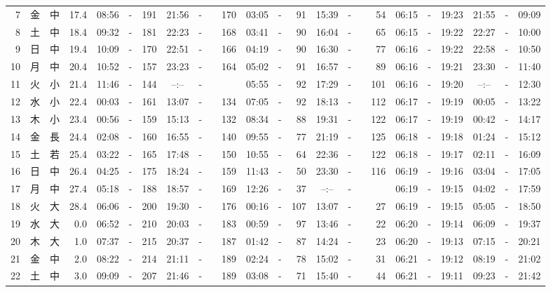 \documentclass[12pt,a4j]{jsarticle}
\begin{document}
\begin{table}[htbp]
\begin{center}
{\begin{tabular}{|rc|cr|ccrccr|ccrccr|ccc|ccc|}
 7 & 金 & 中 & 17.4 &  08:56 &-& 191 &  21:56 &-& 170 &  03:05 &-&  91 &  15:39 &-&  54 & 06:15 & -& 19:23 & 21:55 & -& 09:09 \\
 8 & 土 & 中 & 18.4 &  09:32 &-& 181 &  22:23 &-& 168 &  03:41 &-&  90 &  16:04 &-&  65 & 06:15 & -& 19:22 & 22:27 & -& 10:00 \\
 9 & 日 & 中 & 19.4 &  10:09 &-& 170 &  22:51 &-& 166 &  04:19 &-&  90 &  16:30 &-&  77 & 06:16 & -& 19:22 & 22:58 & -& 10:50 \\
10 & 月 & 中 & 20.4 &  10:52 &-& 157 &  23:23 &-& 164 &  05:02 &-&  91 &  16:57 &-&  89 & 06:16 & -& 19:21 & 23:30 & -& 11:40 \\
11 & 火 & 小 & 21.4 &  11:46 &-& 144 &  --:-- &-&~~~~~ &  05:55 &-&  92 &  17:29 &-& 101 & 06:16 & -& 19:20 & --:-- & -& 12:30 \\
12 & 水 & 小 & 22.4 &  00:03 &-& 161 &  13:07 &-& 134 &  07:05 &-&  92 &  18:13 &-& 112 & 06:17 & -& 19:19 & 00:05 & -& 13:22 \\
13 & 木 & 小 & 23.4 &  00:56 &-& 159 &  15:13 &-& 132 &  08:34 &-&  88 &  19:31 &-& 122 & 06:17 & -& 19:19 & 00:42 & -& 14:17 \\
14 & 金 & 長 & 24.4 &  02:08 &-& 160 &  16:55 &-& 140 &  09:55 &-&  77 &  21:19 &-& 125 & 06:18 & -& 19:18 & 01:24 & -& 15:12 \\
15 & 土 & 若 & 25.4 &  03:22 &-& 165 &  17:48 &-& 150 &  10:55 &-&  64 &  22:36 &-& 122 & 06:18 & -& 19:17 & 02:11 & -& 16:09 \\
16 & 日 & 中 & 26.4 &  04:25 &-& 175 &  18:24 &-& 159 &  11:43 &-&  50 &  23:30 &-& 116 & 06:19 & -& 19:16 & 03:04 & -& 17:05 \\
17 & 月 & 中 & 27.4 &  05:18 &-& 188 &  18:57 &-& 169 &  12:26 &-&  37 &  --:-- &-&~~~~~ & 06:19 & -& 19:15 & 04:02 & -& 17:59 \\
18 & 火 & 大 & 28.4 &  06:06 &-& 200 &  19:30 &-& 176 &  00:16 &-& 107 &  13:07 &-&  27 & 06:19 & -& 19:15 & 05:05 & -& 18:50 \\
19 & 水 & 大 &  0.0 &  06:52 &-& 210 &  20:03 &-& 183 &  00:59 &-&  97 &  13:46 &-&  22 & 06:20 & -& 19:14 & 06:09 & -& 19:37 \\
20 & 木 & 大 &  1.0 &  07:37 &-& 215 &  20:37 &-& 187 &  01:42 &-&  87 &  14:24 &-&  23 & 06:20 & -& 19:13 & 07:15 & -& 20:21 \\
21 & 金 & 中 &  2.0 &  08:22 &-& 214 &  21:11 &-& 189 &  02:24 &-&  78 &  15:02 &-&  31 & 06:21 & -& 19:12 & 08:19 & -& 21:02 \\
22 & 土 & 中 &  3.0 &  09:09 &-& 207 &  21:46 &-& 189 &  03:08 &-&  71 &  15:40 &-&  44 & 06:21 & -& 19:11 & 09:23 & -& 21:42 \\

\end{tabular}}
\end{center}
\end{table}
\end{document}
